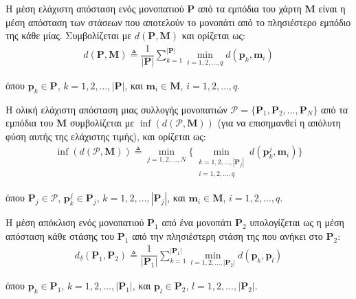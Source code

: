 \begin{bw_box}
\begin{definition}
Η μέση ελάχιστη απόσταση ενός μονοπατιού $\bm{P}$ από τα εμπόδια του χάρτη
$\bm{M}$ είναι η μέση απόσταση των στάσεων που αποτελούν το μονοπάτι από το
πλησιέστερο εμπόδιο της κάθε μίας. Συμβολίζεται με $d(\bm{P},\bm{M})$ και
ορίζεται ως:
\begin{align}
  d(\bm{P},\bm{M}) \triangleq \dfrac{1}{|\bm{P}|} \sum\limits_{k=1}^{|\bm{P}|} \min\limits_{i=1,2,\dots,q} d(\bm{p}_k,\bm{m}_i)
  \label{eq:mean_min_obs_dist}
\end{align}

όπου $\bm{p}_k \in \bm{P}$, $k = 1,2,\dots,|\bm{P}|$, και
$\bm{m}_i \in \bm{M}$, $i = 1,2,\dots,q$.
\end{definition}
\end{bw_box}

\begin{bw_box}
\begin{definition}
Η ολική ελάχιστη απόσταση μιας συλλογής μονοπατιών
$\bm{\mathcal{P}} = \{ \bm{P}_1, \bm{P}_2, \dots, \bm{P}_N \}$ από τα εμπόδια
του $\bm{M}$ συμβολίζεται με $\inf(d(\bm{\mathcal{P}},\bm{M}))$ (για να
επισημανθεί η απόλυτη φύση αυτής της ελάχιστης τιμής), και ορίζεται ως:
\begin{align}
  \inf(d(\mathcal{P},\bm{M})) \triangleq \min\limits_{j=1,2,\dots,N} \big\{ \min\limits_{\substack{k=1,2,\dots, |\bm{P}_j| \\ i=1,2,\dots,q}} d(\bm{p}_k^j,\bm{m}_i) \big\}
  \label{eq:abs_min_obs_dist}
\end{align}

όπου $\bm{P}_j \in \mathcal{P}$, $\bm{p}_k^j \in \bm{P}_j$,
$k = 1,2,\dots,|\bm{P}_j|$, και $\bm{m}_i \in \bm{M}$, $i =1,2,\dots,q$.
\end{definition}
\end{bw_box}

\begin{bw_box}
\begin{definition}
Η μέση απόκλιση ενός μονοπατιού $\bm{P}_1$ από ένα μονοπάτι $\bm{P}_2$
υπολογίζεται ως η μέση απόσταση κάθε στάσης του $\bm{P}_1$ από την πλησιέστερη
στάση της που ανήκει στο $\bm{P}_2$:
\begin{align}
  d_{\delta}(\bm{P}_1,\bm{P}_2) \triangleq \dfrac{1}{|\bm{P}_1|} \sum\limits_{k=1}^{|\bm{P}_1|} \min\limits_{l=1,2,\dots,|\bm{P}_2|} d(\bm{p}_k, \bm{p}_l)
\end{align}

όπου $\bm{p}_k \in \bm{P}_1$, $k = 1,2,\dots,|\bm{P}_1|$, και
$\bm{p}_l \in \bm{P}_2$, $l = 1,2,\dots,|\bm{P}_2|$.
\end{definition}
\end{bw_box}

